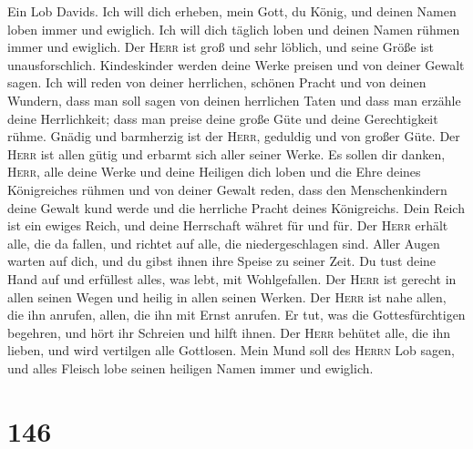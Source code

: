  Ein Lob Davids. Ich will dich erheben, mein Gott, du
König, und deinen Namen loben immer und ewiglich.  Ich
will dich täglich loben und deinen Namen rühmen immer und ewiglich.
 Der \textsc{Herr} ist groß und sehr löblich, und seine
Größe ist unausforschlich.  Kindeskinder werden deine
Werke preisen und von deiner Gewalt sagen.  Ich will reden
von deiner herrlichen, schönen Pracht und von deinen Wundern,
 dass man soll sagen von deinen herrlichen Taten und dass
man erzähle deine Herrlichkeit;  dass man preise deine
große Güte und deine Gerechtigkeit rühme.  Gnädig und
barmherzig ist der \textsc{Herr}, geduldig und von großer Güte.
 Der \textsc{Herr} ist allen gütig und erbarmt sich aller
seiner Werke.  Es sollen dir danken, \textsc{Herr}, alle
deine Werke und deine Heiligen dich loben  und die Ehre
deines Königreiches rühmen und von deiner Gewalt reden, 
dass den Menschenkindern deine Gewalt kund werde und die herrliche
Pracht deines Königreichs.  Dein Reich ist ein ewiges
Reich, und deine Herrschaft währet für und für.  Der
\textsc{Herr} erhält alle, die da fallen, und richtet auf alle, die
niedergeschlagen sind.  Aller Augen warten auf dich, und
du gibst ihnen ihre Speise zu seiner Zeit.  Du tust deine
Hand auf und erfüllest alles, was lebt, mit Wohlgefallen.
 Der \textsc{Herr} ist gerecht in allen seinen Wegen und
heilig in allen seinen Werken.  Der \textsc{Herr} ist
nahe allen, die ihn anrufen, allen, die ihn mit Ernst anrufen.
 Er tut, was die Gottesfürchtigen begehren, und hört ihr
Schreien und hilft ihnen.  Der \textsc{Herr} behütet
alle, die ihn lieben, und wird vertilgen alle Gottlosen. 
Mein Mund soll des \textsc{Herrn} Lob sagen, und alles Fleisch lobe
seinen heiligen Namen immer und ewiglich.

\hypertarget{section-145}{%
\section{146}\label{section-145}}

